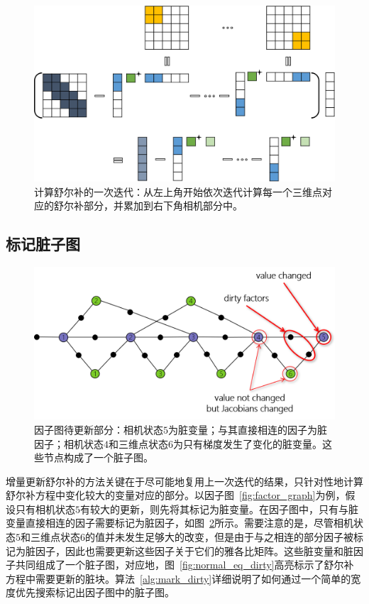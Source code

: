 \begin{figure}[htb!]
    \centering
    \includegraphics[width=\textwidth]{Pictures/schur_complement.png}
    \caption{计算舒尔补的一次迭代：从左上角开始依次迭代计算每一个三维点对应的舒尔补部分，并累加到右下角相机部分中。}
    \label{fig:schur_complement}
\end{figure}

\subsection{标记脏子图}

\begin{figure}[htb!]
    \centering
    \includegraphics[scale=.7]{Pictures/factor_graph_dirty.png}
    \caption{因子图待更新部分：相机状态$5$为脏变量；与其直接相连的因子为脏因子；相机状态$4$和三维点状态$6$为只有梯度发生了变化的脏变量。这些节点构成了一个脏子图。}
    \label{fig:factor_graph_dirty}
\end{figure}

增量更新舒尔补的方法关键在于尽可能地复用上一次迭代的结果，只针对性地计算舒尔补方程中变化较大的变量对应的部分。以因子图~\ref{fig:factor_graph}为例，假设只有相机状态$5$有较大的更新，则先将其标记为脏变量。在因子图中，只有与脏变量直接相连的因子需要标记为脏因子，如图~\ref{fig:factor_graph_dirty}所示。需要注意的是，尽管相机状态$5$和三维点状态$6$的值并未发生足够大的改变，但是由于与之相连的部分因子被标记为脏因子，因此也需要更新这些因子关于它们的雅各比矩阵。这些脏变量和脏因子共同组成了一个脏子图，对应地，图~\ref{fig:normal_eq_dirty}高亮标示了舒尔补方程中需要更新的脏块。算法~\ref{alg:mark_dirty}详细说明了如何通过一个简单的宽度优先搜索标记出因子图中的脏子图。

